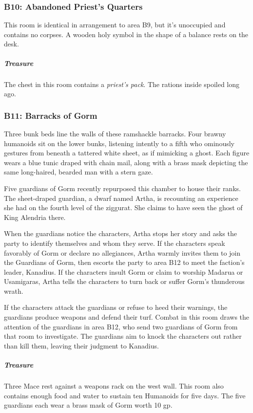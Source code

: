 \documentclass[10pt,a4paper,twoside,bg=print,twocolumn,openany,nodeprecatedcode]{dndbook}
\begin{document}
\subsubsection{B10: Abandoned Priest's Quarters}
This room is identical in arrangement to area B9, but it's unoccupied and contains no corpses. A wooden holy symbol in the shape of a balance rests on the desk.

\subparagraph{Treasure}
The chest in this room contains a \textit{priest's pack}. The rations inside spoiled long ago.

\subsubsection{B11: Barracks of Gorm}
\begin{DndReadAloud}{}
Three bunk beds line the walls of these ramshackle barracks. Four brawny humanoids sit on the lower bunks, listening intently to a fifth who ominously gestures from beneath a tattered white sheet, as if mimicking a ghost. Each figure wears a blue tunic draped with chain mail, along with a brass mask depicting the same long-haired, bearded man with a stern gaze.

\end{DndReadAloud}

Five guardians of Gorm recently repurposed this chamber to house their ranks. The sheet-draped guardian, a dwarf named Artha, is recounting an experience she had on the fourth level of the ziggurat. She claims to have seen the ghost of King Alendria there.

When the guardians notice the characters, Artha stops her story and asks the party to identify themselves and whom they serve. If the characters speak favorably of Gorm or declare no allegiances, Artha warmly invites them to join the Guardians of Gorm, then escorts the party to area B12 to meet the faction's leader, Kanadius. If the characters insult Gorm or claim to worship Madarua or Usamigaras, Artha tells the characters to turn back or suffer Gorm's thunderous wrath.

If the characters attack the guardians or refuse to heed their warnings, the guardians produce weapons and defend their turf. Combat in this room draws the attention of the guardians in area B12, who send two guardians of Gorm from that room to investigate. The guardians aim to knock the characters out rather than kill them, leaving their judgment to Kanadius.

\subparagraph{Treasure}
Three Mace rest against a weapons rack on the west wall. This room also contains enough food and water to sustain ten Humanoids for five days. The five guardians each wear a brass mask of Gorm worth 10 gp.
\end{document}
